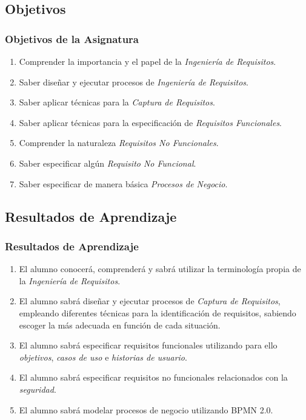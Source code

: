 \documentclass[handout,a4paper,slidestop,xcolor=pst,dvips,blue]{beamer}
\begin{document}
\subsection{Objetivos}

\begin{frame}[c]
	\frametitle{Objetivos de la Asignatura}
    \begin{enumerate}[<+->]
			\item Comprender la importancia y el papel de la \emph{Ingeniería de Requisitos}.
            \item Saber diseñar y ejecutar procesos de \emph{Ingeniería de Requisitos}.
			\item Saber aplicar técnicas para la \emph{Captura de Requisitos}.
			\item Saber aplicar técnicas para la especificación de \emph{Requisitos Funcionales}.
			\item Comprender la naturaleza \emph{Requisitos No Funcionales}.
			\item Saber especificar algún \emph{Requisito No Funcional}.
			\item Saber especificar de manera básica \emph{Procesos de Negocio}.
	 \end{enumerate}
\end{frame}

\subsection{Resultados de Aprendizaje}

\begin{frame}[c]
	\frametitle{Resultados de Aprendizaje}
    	\begin{enumerate}[<+->]
			\item El alumno conocerá, comprenderá y sabrá utilizar la terminología propia de la \emph{Ingeniería de Requisitos}.
            \item El alumno sabrá diseñar y ejecutar procesos de \emph{Captura de Requisitos}, empleando diferentes técnicas para la identificación de requisitos, sabiendo escoger la más adecuada en función de cada situación.
            \item El alumno sabrá especificar requisitos funcionales utilizando para ello \emph{objetivos}, \emph{casos de uso} e \emph{historias de usuario}.
            \item El alumno sabrá especificar requisitos no funcionales relacionados con la \emph{seguridad}.
            \item El alumno sabrá modelar procesos de negocio utilizando BPMN 2.0.
		\end{enumerate}
\end{frame}
\end{document}
